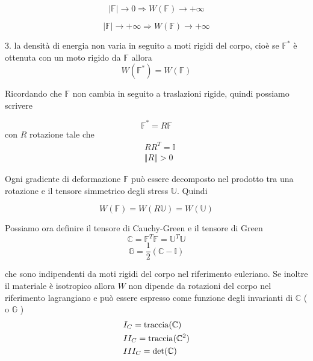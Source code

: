 \begin{equation*}
\vert \mathbb{F} \vert \rightarrow 0 \Rightarrow W(\mathbb{F}) \rightarrow +\infty
\end{equation*}

\begin{equation*}
\vert \mathbb{F} \vert \rightarrow +\infty \Rightarrow W(\mathbb{F}) \rightarrow +\infty
\end{equation*}

3.  la densità di energia non varia in seguito a moti rigidi del corpo, cioè se $\mathbb{F}^*$ è ottenuta con un moto rigido da $\mathbb{F}$ allora 
\begin{equation*}
W(\mathbb{F}^*) = W(\mathbb{F})
\end{equation*}

Ricordando che $\mathbb{F}$ non cambia in seguito a traslazioni rigide, quindi possiamo scrivere

\begin{equation*}
\mathbb{F}^* = R\mathbb{F}
\end{equation*}
con $R$ rotazione tale che 
\begin{align*}
&RR^T = \mathbb{I} \\
&\Vert R \Vert > 0
\end{align*}

Ogni gradiente di deformazione $\mathbb{F}$ può essere decomposto nel prodotto tra una rotazione e il tensore simmetrico degli stress $\mathbb{U}$. Quindi

\begin{equation*}
W(\mathbb{F}) = W(R\mathbb{U}) = W(\mathbb{U})
\end{equation*}


Possiamo ora definire il tensore di Cauchy-Green e il tensore di Green
\begin{equation*}
\mathbb{C} = \mathbb{F}^T\mathbb{F} = \mathbb{U}^T\mathbb{U}
\end{equation*}
\begin{equation*}
\mathbb{G} = \frac{1}{2}(\mathbb{C}-\mathbb{I})
\end{equation*}

che sono indipendenti da moti rigidi del corpo nel riferimento euleriano. Se inoltre il materiale è isotropico allora $W$ non dipende da rotazioni del corpo nel riferimento lagrangiano e può essere espresso come funzione degli invarianti di $\mathbb{C}$ ( o $\mathbb{G}$ )
\begin{align*}
&I_C = \operatorname{traccia}(\mathbb{C}) \\
&II_C = \operatorname{traccia}(\mathbb{C}^2) \\
&III_C = \det(\mathbb{C}) \\
\end{align*}

